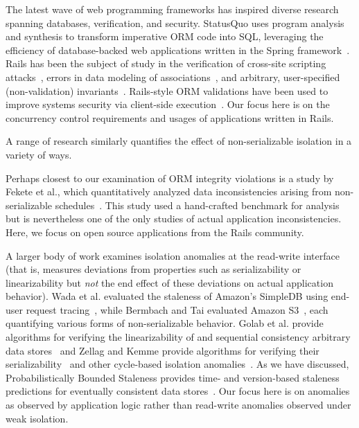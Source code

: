 The latest wave of web programming frameworks has inspired diverse
research spanning databases, verification, and security. StatusQuo
uses program analysis and synthesis to transform imperative ORM code
into SQL, leveraging the efficiency of database-backed web
applications written in the Spring framework~\cite{statusquo}. Rails
has been the subject of study in the verification of cross-site
scripting attacks~\cite{rails-xss}, errors in data
modeling of associations~\cite{rails-bounded}, and arbitrary,
user-specified (non-validation) invariants~\cite{invariant-web}.
Rails-style ORM validations have been used to improve systems security
via client-side execution~\cite{waves,caveat}. Our focus here is on
the concurrency control requirements and usages of applications
written in Rails.

 A range of research similarly
quantifies the effect of non-serializable isolation in a variety of
ways.

Perhaps closest to our examination of ORM integrity violations is a
study by Fekete et al., which quantitatively analyzed data
inconsistencies arising from non-serializable
schedules~\cite{fekete-quantifying}. This study used a hand-crafted
benchmark for analysis but is nevertheless one of the only studies of
actual application inconsistencies. Here, we focus on open source
applications from the Rails community.

A larger body of work examines isolation anomalies at the read-write
interface (that is, measures deviations from properties such as
serializability or linearizability but \textit{not} the end effect of
these deviations on actual application behavior). Wada et
al. evaluated the staleness of Amazon's SimpleDB using end-user
request tracing~\cite{wada-data}, while Bermbach and Tai evaluated
Amazon S3~\cite{bermbach-eventual}, each quantifying various forms of
non-serializable behavior. Golab et al. provide algorithms for
verifying the linearizability of and sequential consistency arbitrary
data stores~\cite{golab-analyzing} and Zellag and Kemme provide
algorithms for verifying their
serializability~\cite{zellag-consistent} and other cycle-based
isolation anomalies~\cite{zellag-real}. As we have discussed,
Probabilistically Bounded Staleness provides time- and version-based
staleness predictions for eventually consistent data
stores~\cite{pbs}. Our focus here is on anomalies as observed by
application logic rather than read-write anomalies observed under weak
isolation.

